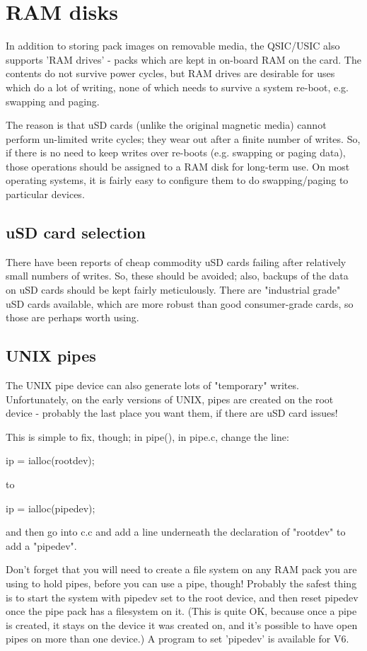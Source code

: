 \section{RAM disks}

In addition to storing pack images on removable media, the QSIC/USIC also
supports 'RAM drives' - packs which are kept in on-board RAM on the card. The
contents do not survive power cycles, but RAM drives are desirable for uses
which do a lot of writing, none of which needs to survive a system re-boot,
e.g. swapping and paging.

The reason is that uSD cards (unlike the original magnetic media) cannot
perform un-limited write cycles; they wear out after a finite number of
writes. So, if there is no need to keep writes over re-boots (e.g. swapping
or paging data), those operations should be assigned to a RAM disk for
long-term use. On most operating systems, it is fairly easy to configure them
to do swapping/paging to particular devices.

\subsection{uSD card selection}

There have been reports of cheap commodity uSD cards failing after relatively
small numbers of writes. So, these should be avoided; also, backups of the
data on uSD cards should be kept fairly meticulously. There are "industrial
grade" uSD cards available, which are more robust than good consumer-grade
cards, so those are perhaps worth using.

\subsection{UNIX pipes}

The UNIX pipe device can also generate lots of "temporary" writes.
Unfortunately, on the early versions of UNIX, pipes are created on the root
device - probably the last place you want them, if there are uSD card issues!

This is simple to fix, though; in pipe(), in pipe.c, change the line:

	ip = ialloc(rootdev);

to

	ip = ialloc(pipedev);

and then go into c.c and add a line underneath the declaration of "rootdev"
to add a "pipedev".

Don't forget that you will need to create a file system on any RAM pack you
are using to hold pipes, before you can use a pipe, though! Probably the
safest thing is to start the system with pipedev set to the root device, and
then reset pipedev once the pipe pack has a filesystem on it. (This is quite
OK, because once a pipe is created, it stays on the device it was created on,
and it's possible to have open pipes on more than one device.) A program to
set 'pipedev' is available for V6.

